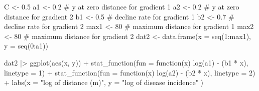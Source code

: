 \documentclass[
  letterpaper,
  DIV=11,
  numbers=noendperiod]{scrreprt}
\newenvironment{Shaded}{\begin{snugshade}}{\end{snugshade}}
\newcommand{\AttributeTok}[1]{\textcolor[rgb]{0.40,0.45,0.13}{#1}}
\newcommand{\CommentTok}[1]{\textcolor[rgb]{0.37,0.37,0.37}{#1}}
\newcommand{\ControlFlowTok}[1]{\textcolor[rgb]{0.00,0.23,0.31}{#1}}
\newcommand{\DecValTok}[1]{\textcolor[rgb]{0.68,0.00,0.00}{#1}}
\newcommand{\FloatTok}[1]{\textcolor[rgb]{0.68,0.00,0.00}{#1}}
\newcommand{\FunctionTok}[1]{\textcolor[rgb]{0.28,0.35,0.67}{#1}}
\newcommand{\NormalTok}[1]{\textcolor[rgb]{0.00,0.23,0.31}{#1}}
\newcommand{\OtherTok}[1]{\textcolor[rgb]{0.00,0.23,0.31}{#1}}
\newcommand{\SpecialCharTok}[1]{\textcolor[rgb]{0.37,0.37,0.37}{#1}}
\newcommand{\StringTok}[1]{\textcolor[rgb]{0.13,0.47,0.30}{#1}}
\begin{document}
\begin{Shaded}
\begin{Highlighting}[]
\NormalTok{C }\OtherTok{\textless{}{-}} \FloatTok{0.5}
\NormalTok{a1 }\OtherTok{\textless{}{-}} \FloatTok{0.2} \CommentTok{\# y at zero distance for gradient 1}
\NormalTok{a2 }\OtherTok{\textless{}{-}} \FloatTok{0.2} \CommentTok{\# y at zero distance for gradient 2}
\NormalTok{b1 }\OtherTok{\textless{}{-}} \FloatTok{0.5} \CommentTok{\# decline rate for gradient 1}
\NormalTok{b2 }\OtherTok{\textless{}{-}} \FloatTok{0.7} \CommentTok{\# decline rate for gradient 2}
\NormalTok{max1 }\OtherTok{\textless{}{-}} \DecValTok{80} \CommentTok{\# maximum distance for gradient 1}
\NormalTok{max2 }\OtherTok{\textless{}{-}} \DecValTok{80} \CommentTok{\# maximum distance for gradient 2}
\NormalTok{dat2 }\OtherTok{\textless{}{-}} \FunctionTok{data.frame}\NormalTok{(}\AttributeTok{x =} \FunctionTok{seq}\NormalTok{(}\DecValTok{1}\SpecialCharTok{:}\NormalTok{max1), }\AttributeTok{y =} \FunctionTok{seq}\NormalTok{(}\DecValTok{0}\SpecialCharTok{:}\NormalTok{a1))}

\NormalTok{dat2 }\SpecialCharTok{|\textgreater{}}
  \FunctionTok{ggplot}\NormalTok{(}\FunctionTok{aes}\NormalTok{(x, y)) }\SpecialCharTok{+}
  \FunctionTok{stat\_function}\NormalTok{(}\AttributeTok{fun =} \ControlFlowTok{function}\NormalTok{(x) }\FunctionTok{log}\NormalTok{(a1) }\SpecialCharTok{{-}}\NormalTok{ (b1 }\SpecialCharTok{*}\NormalTok{ x), }\AttributeTok{linetype =} \DecValTok{1}\NormalTok{) }\SpecialCharTok{+}
  \FunctionTok{stat\_function}\NormalTok{(}\AttributeTok{fun =} \ControlFlowTok{function}\NormalTok{(x) }\FunctionTok{log}\NormalTok{(a2) }\SpecialCharTok{{-}}\NormalTok{ (b2 }\SpecialCharTok{*}\NormalTok{ x), }\AttributeTok{linetype =} \DecValTok{2}\NormalTok{) }\SpecialCharTok{+}
  \FunctionTok{labs}\NormalTok{(}\AttributeTok{x =} \StringTok{"log of distance (m)"}\NormalTok{, }\AttributeTok{y =} \StringTok{"log of disease incidence"}
\NormalTok{  )}
\end{Highlighting}
\end{Shaded}
\end{document}
